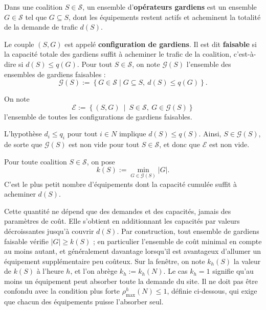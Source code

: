 \begin{definition}
Dans une coalition \(S\in\mathcal S\), un ensemble d'\textbf{opérateurs
gardiens} est un ensemble \(G\in\mathcal S\) tel que \(G\subseteq S\), dont les
équipements restent actifs et acheminent la totalité de la demande de trafic
\(d(S)\).

Le couple \((S,G)\) est appelé \textbf{configuration de gardiens}. Il est dit
\textbf{faisable} si la capacité totale des gardiens suffit à acheminer le
trafic de la coalition, c'est-à-dire si \(d(S)\leqslant q(G)\).
Pour tout \(S\in\mathcal S\), on note \(\mathcal G(S)\) l'ensemble des
ensembles de gardiens faisables :
\[
    \mathcal G(S)
    :=\left\{G\in\mathcal S\mid G\subseteq S,\ d(S)\leqslant q(G)\right\}.
\]

On note
\[
    \mathcal E:=
    \left\{(S,G)\ \middle|\ S\in\mathcal S,\ G\in\mathcal G(S)\right\}
\]
l'ensemble de toutes les configurations de gardiens faisables.

L'hypothèse \(d_i\leqslant q_i\) pour tout \(i\in N\) implique
\(d(S)\leqslant q(S)\). Ainsi, \(S\in\mathcal G(S)\), de sorte que
\(\mathcal G(S)\) est non vide pour tout \(S\in\mathcal S\), et donc que
\(\mathcal E\) est non vide.

\end{definition}

\begin{definition}
\label{def:nombre_minimal_gardiens}
Pour toute coalition \(S\in\mathcal S\), on pose
\begin{equation}
    k(S):=\min_{G\in\mathcal G(S)}|G|.
    \label{eq:nombre_minimal_gardiens}
\end{equation}
C'est le plus petit nombre d'équipements dont la capacité cumulée suffit à
acheminer \(d(S)\).
\end{definition}

Cette quantité ne dépend que des demandes et des capacités, jamais des
paramètres de coût. Elle s'obtient en additionnant les capacités par valeurs
décroissantes jusqu'à couvrir \(d(S)\). Par construction, tout ensemble de
gardiens faisable vérifie \(|G|\geqslant k(S)\) ; en particulier l'ensemble de
coût minimal en compte au moins autant, et généralement davantage lorsqu'il
est avantageux d'allumer un équipement supplémentaire peu coûteux. Sur la
fenêtre, on note \(k_h(S)\) la valeur de \(k(S)\) à l'heure \(h\), et l'on
abrège \(k_h:=k_h(N)\). Le cas \(k_h=1\) signifie qu'au moins un équipement
peut absorber toute la demande du site. Il ne doit pas être confondu avec la
condition plus forte \(\rho_{\max}^h(N)\leqslant1\), définie ci-dessous, qui
exige que chacun des équipements puisse l'absorber seul.


